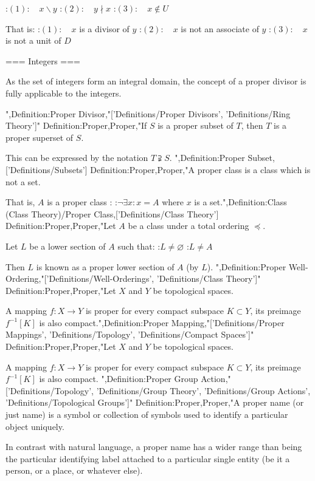 :$(1): \quad x \mathrel \backslash y$
:$(2): \quad y \nmid x$
:$(3): \quad x \notin U$

That is:
:$(1): \quad x$ is a divisor of $y$
:$(2): \quad x$ is not an associate of $y$
:$(3): \quad x$ is not a unit of $D$


=== Integers ===

As the set of integers form an integral domain, the concept of a proper divisor is fully applicable to the integers.

",Definition:Proper Divisor,"['Definitions/Proper Divisors', 'Definitions/Ring Theory']"
Definition:Proper,Proper,"If $S$ is a proper subset of $T$, then $T$ is a proper superset of $S$.

This can be expressed by the notation $T \supsetneqq S$.
",Definition:Proper Subset,['Definitions/Subsets']
Definition:Proper,Proper,"A proper class is a class which is not a set.

That is, $A$ is a proper class :
:$\neg \exists x: x = A$
where $x$ is a set.",Definition:Class (Class Theory)/Proper Class,['Definitions/Class Theory']
Definition:Proper,Proper,"Let $A$ be a class under a total ordering $\preccurlyeq$.

Let $L$ be a lower section of $A$ such that:
:$L \ne \varnothing$
:$L \ne A$

Then $L$ is known as a proper lower section of $A$ (by $L$).
",Definition:Proper Well-Ordering,"['Definitions/Well-Orderings', 'Definitions/Class Theory']"
Definition:Proper,Proper,"Let $X$ and $Y$ be topological spaces.


A mapping $f: X \to Y$ is proper  for every compact subspace $K \subset Y$, its preimage $f^{-1} \left[ K \right]$ is also compact.",Definition:Proper Mapping,"['Definitions/Proper Mappings', 'Definitions/Topology', 'Definitions/Compact Spaces']"
Definition:Proper,Proper,"Let $X$ and $Y$ be topological spaces.


A mapping $f: X \to Y$ is proper  for every compact subspace $K \subset Y$, its preimage $f^{-1} \left[ K \right]$ is also compact.
",Definition:Proper Group Action,"['Definitions/Topology', 'Definitions/Group Theory', 'Definitions/Group Actions', 'Definitions/Topological Groups']"
Definition:Proper,Proper,"A proper name (or just name) is a symbol or collection of symbols used to identify a particular object uniquely.


In contrast with natural language, a proper name has a wider range than being the particular identifying label attached to a particular single entity (be it a person, or a place, or whatever else).

